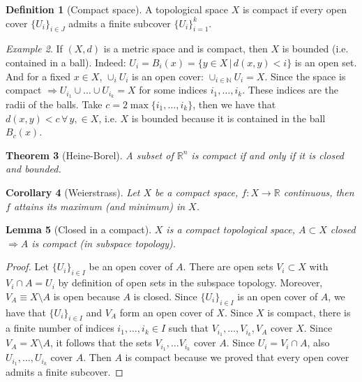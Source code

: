 \documentclass[a4paper,11pt,titlepage, article, oneside]{memoir}
\numberwithin{equation}{section}
\newtheorem{theorem}{Theorem}[section]
\newtheorem{corollary}[theorem]{Corollary}
\newtheorem{lemma}[theorem]{Lemma}
\theoremstyle{definition}
\newtheorem{definition}[theorem]{Definition}
\theoremstyle{remark}
\newtheorem{example}[theorem]{Example}
\newcommand{\rfield}{\mathbb{R}}
\begin{document}
\begin{definition} [Compact space]
A topological space $X$ is compact if every open cover $\{U_i\}_{i \in J}$ admits a finite subcover $\{U_i\}_{i=1}^k$.
\end{definition}

\begin{tcolorbox}
\begin{example}
If $(X, d)$ is a metric space and is compact, then $X$ is bounded (i.e. contained in a ball). Indeed: $U_i = B_i(x) = \{y \in X\, |\, d(x, y) < i\}$ is an open set. And for a fixed $x \in X$, $\cup_i U_i$ is an open cover: $\cup_{i \in \mathbb{N}} U_i = X$. Since the space is compact $\Rightarrow U_{i_1} \cup \ldots \cup U_{i_k} = X$ for some indices $i_1, \ldots, i_k$. These indices are the radii of the balls. Take $c = 2 \max\{i_1, \ldots, i_k\}$, then we have that $d(x, y) < c \, \forall\, y, \in X$, i.e. $X$ is bounded because it is contained in the ball $B_c(x)$.
\end{example}
\end{tcolorbox}

\begin{theorem}[Heine-Borel]
A subset of $\rfield^n$ is compact if and only if it is closed and bounded.
\end{theorem}

\begin{corollary} [Weierstrass]
Let $X$ be a compact space, $f \colon X \rightarrow \rfield$ continuous, then $f$ attains its maximum (and minimum) in $X$.
\end{corollary}

\begin{lemma}[Closed in a compact] \label{closedincomp}
$X$ is a compact topological space, $A \subset X$ closed $\Rightarrow A$ is compact (in subspace topology). 
\end{lemma}
\begin{proof}
Let $\{U_i\}_{i \in I}$ be an open cover of $A$. There are open sets $V_i \subset X$ with $V_i \cap A = U_i$ by definition of open sets in the subspace topology. Moreover, $V_A \equiv X \setminus A$ is open because $A$ is closed. Since $\{U_i\}_{i \in I}$ is an open cover of $A$, we have that $\{U_i\}_{i \in I}$ and $V_A$ form an open cover of $X$. Since $X$ is compact, there is a finite number of indices $i_1, \ldots, i_k \in I$ such that $V_{i_1}, \ldots, V_{i_k}, V_A$ cover $X$. Since $V_A = X \setminus A$, it follows that the sets $V_{i_1}, \ldots V_{i_k}$ cover $A$. Since $U_i = V_i \cap A$, also $U_{i_1}, \ldots, U_{i_k}$ cover $A$. Then $A$ is compact because we proved that every open cover admits a finite subcover.
\end{proof}
\end{document}
